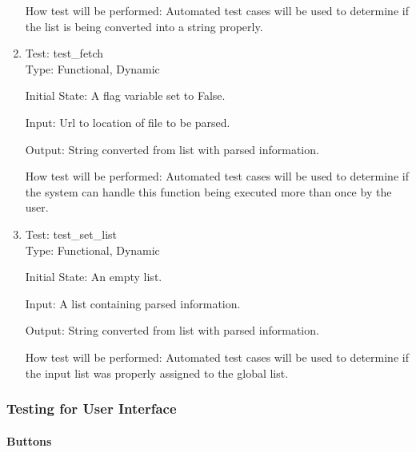 \documentclass[12pt, titlepage]{article}
\begin{document}
\begin{enumerate}
How test will be performed: Automated test cases will be used to determine if the list is being converted into a string properly.\\ 
\color{black}

\color{blue}\item{Test: test\_fetch\\}
Type: Functional, Dynamic
					
Initial State: A flag variable set to False.
					
Input: Url to location of file to be parsed.
					
Output: String converted from list with parsed information.
					
How test will be performed: Automated test cases will be used to determine if the system can handle this function being executed more than once by the user.\\
\color{black}

\color{blue}\item{Test: test\_set\_list\\}
Type: Functional, Dynamic
					
Initial State: An empty list.
					
Input: A list containing parsed information.
					
Output: String converted from list with parsed information.
					
How test will be performed: Automated test cases will be used to determine if the input list was properly assigned to the global list.\\
\color{black}

\end{enumerate}

\subsubsection{Testing for User Interface}


\paragraph{Buttons}
\end{document}
